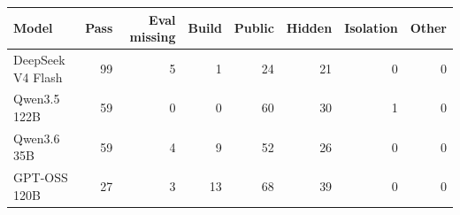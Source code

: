 \begin{tabular}{lrrrrrrr}
\toprule
\textbf{Model} & \textbf{Pass} & \textbf{Eval missing} & \textbf{Build} & \textbf{Public} & \textbf{Hidden} & \textbf{Isolation} & \textbf{Other} \\
\midrule
DeepSeek V4 Flash & 99 & 5 & 1 & 24 & 21 & 0 & 0 \\
Qwen3.5 122B & 59 & 0 & 0 & 60 & 30 & 1 & 0 \\
Qwen3.6 35B & 59 & 4 & 9 & 52 & 26 & 0 & 0 \\
GPT-OSS 120B & 27 & 3 & 13 & 68 & 39 & 0 & 0 \\
\bottomrule
\end{tabular}
